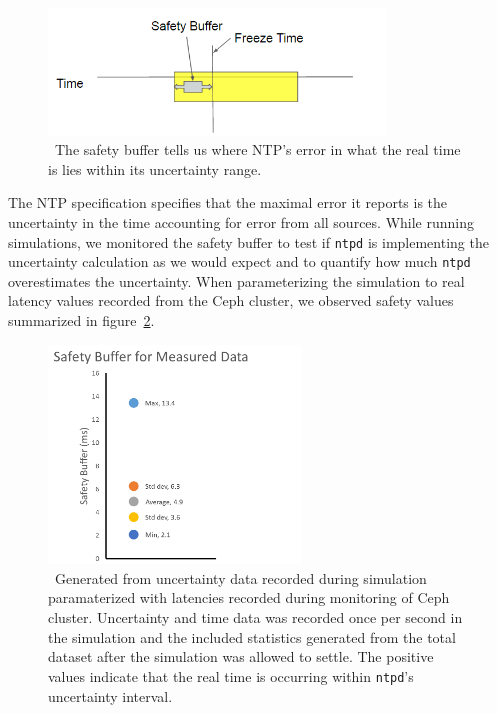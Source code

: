 \begin{figure}[h]
  \caption{~The safety buffer tells us where NTP's error in what the real time is lies within its uncertainty range.} 
  \label{fig:safety-diag}
  \centering
  \includegraphics[width=0.8\textwidth]{safety-diagram.png}
\end{figure}

The NTP specification specifies that the maximal error it reports is the 
uncertainty in the time accounting for error from all sources.
While running simulations, we monitored the safety buffer to test if 
\texttt{ntpd} is implementing the uncertainty calculation as we would expect
and to quantify how much \texttt{ntpd} overestimates the uncertainty.
When parameterizing the simulation to real latency values recorded from the 
Ceph cluster, we observed safety values summarized in figure~\ref{fig:safety-data}.

\begin{figure}[h]
  \caption{~Generated from uncertainty data recorded during simulation paramaterized
  with latencies recorded during monitoring of Ceph cluster. Uncertainty and time
  data was recorded once per second in the simulation and the included statistics 
  generated from the total dataset after the simulation was allowed to settle. 
  The positive values indicate that the real time is occurring within \texttt{ntpd}'s 
  uncertainty interval.}
  \label{fig:safety-data}
  \centering
  \includegraphics[width=0.6\textwidth]{5pointsSafety.png}
\end{figure}

